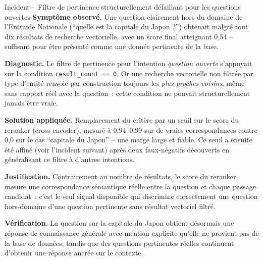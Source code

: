 \begin{probbox}{Incident -- Filtre de pertinence structurellement défaillant pour les questions ouvertes}
\textbf{Symptôme observé.} Une question clairement hors du domaine de l'Entraide Nationale (``quelle est la capitale du Japon ?'') obtenait malgré tout dix résultats de recherche vectorielle, avec un score final atteignant 0,54 -- suffisant pour être présenté comme une donnée pertinente de la base.

\textbf{Diagnostic.} Le filtre de pertinence pour l'intention \emph{question ouverte} s'appuyait sur la condition \texttt{result\_count == 0}. Or une recherche vectorielle non filtrée par type d'entité renvoie par construction toujours les \emph{plus proches voisins}, même sans rapport réel avec la question~: cette condition ne pouvait structurellement jamais être vraie.

\textbf{Solution appliquée.} Remplacement du critère par un seuil sur le score du reranker (cross-encoder), mesuré à 0,94--0,99 sur de vraies correspondances contre 0,0 sur le cas ``capitale du Japon'' -- une marge large et fiable. Ce seuil a ensuite été affiné (voir l'incident suivant) après deux faux-négatifs découverts en généralisant ce filtre à d'autres intentions.

\textbf{Justification.} Contrairement au nombre de résultats, le score du reranker mesure une correspondance sémantique réelle entre la question et chaque passage candidat~: c'est le seul signal disponible qui discrimine correctement une question hors-domaine d'une question pertinente sans résultat vectoriel filtré.

\textbf{Vérification.} La question sur la capitale du Japon obtient désormais une réponse de connaissance générale avec mention explicite qu'elle ne provient pas de la base de données, tandis que des questions pertinentes réelles continuent d'obtenir une réponse ancrée sur le contexte.
\end{probbox}

